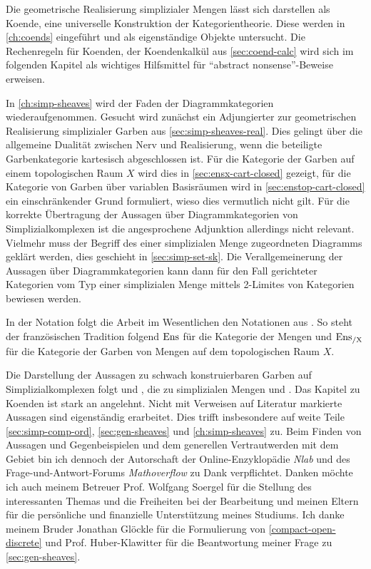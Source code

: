 Die geometrische Realisierung simplizialer Mengen lässt sich
darstellen als Koende, eine universelle Konstruktion der
Kategorientheorie. Diese werden in \ref{ch:coends} eingeführt und als
eigenständige Objekte untersucht. Die Rechenregeln für Koenden, der
Koendenkalkül aus \ref{sec:coend-calc} wird sich im folgenden Kapitel
als wichtiges Hilfsmittel für ``abstract nonsense''-Beweise erweisen.

In \ref{ch:simp-sheaves} wird der Faden der Diagrammkategorien
wiederaufgenommen. Gesucht wird zunächst ein Adjungierter zur
geometrischen Realisierung simplizialer Garben aus
\ref{sec:simp-sheaves-real}. Dies gelingt über die allgemeine Dualität
zwischen Nerv und Realisierung, wenn die beteiligte Garbenkategorie
kartesisch abgeschlossen ist.  Für die Kategorie der Garben auf einem
topologischen Raum $X$ wird dies in \ref{sec:ensx-cart-closed}
gezeigt, für die Kategorie von Garben über variablen Basisräumen wird
in \ref{sec:enstop-cart-closed} ein einschränkender Grund formuliert,
wieso dies vermutlich nicht gilt. Für die korrekte Übertragung der
Aussagen über Diagrammkategorien von Simplizialkomplexen ist die
angesprochene Adjunktion allerdings nicht relevant. Vielmehr muss der
Begriff des einer simplizialen Menge zugeordneten Diagramms geklärt
werden, dies geschieht in \ref{sec:simp-set-sk}. Die Verallgemeinerung
der Aussagen über Diagrammkategorien kann dann für den Fall
gerichteter Kategorien vom Typ einer simplizialen Menge mittels
2-Limites von Kategorien bewiesen werden.

In der Notation folgt die Arbeit im Wesentlichen den Notationen aus
\cite{TG}. So steht der französischen Tradition folgend $\operatorname{Ens}$ für die
Kategorie der Mengen und $\operatorname{Ens_{/X}}$ für die Kategorie der Garben von
Mengen auf dem topologischen Raum $X$.

Die Darstellung der Aussagen zu schwach konstruierbaren Garben auf
Simplizialkomplexen folgt \cite{KS} und \cite{WS}, die zu simplizialen
Mengen \cite{GJ} und \cite{GM}. Das Kapitel zu Koenden ist stark an
\cite{Lore} angelehnt. Nicht mit Verweisen auf Literatur markierte
Aussagen sind eigenständig erarbeitet. Dies trifft insbesondere auf
weite Teile \ref{sec:simp-comp-ord}, \ref{sec:gen-sheaves} und
\ref{ch:simp-sheaves} zu. Beim Finden von Aussagen und Gegenbeispielen
und dem generellen Vertrautwerden mit dem Gebiet bin ich dennoch der
Autorschaft der Online-Enzyklopädie \emph{Nlab} und des
Frage-und-Antwort-Forums \emph{Mathoverflow} zu Dank
verpflichtet. Danken möchte ich auch meinem Betreuer Prof. Wolfgang
Soergel für die Stellung des interessanten Themas und die Freiheiten
bei der Bearbeitung und meinen Eltern für die persönliche und
finanzielle Unterstützung meines Studiums. Ich danke meinem Bruder
Jonathan Glöckle für die Formulierung von \ref{compact-open-discrete}
und Prof. Huber-Klawitter für die Beantwortung meiner Frage zu
\ref{sec:gen-sheaves}.
